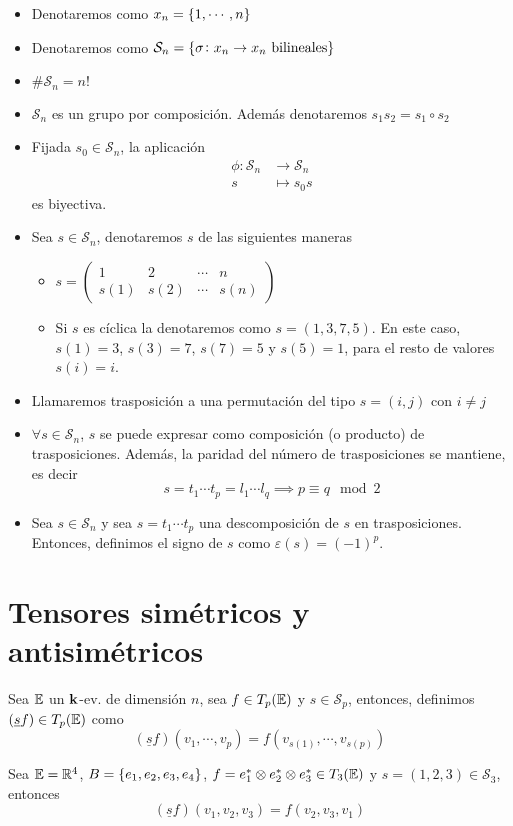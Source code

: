 \begin{itemize}
	\item Denotaremos como $x_n = \left\{1, \cdots, n\right\}$
	\item Denotaremos como $\mathcal{S}_n =\left\{\sigma\colon x_n \to
		x_n \text{ bilineales}\right\}$
	\item $\#\mathcal{S}_n= n!$
	\item $\mathcal{S}_n$ es un grupo por composición. Además denotaremos
		$s_1 s_2 = s_1 \circ s_2$
	\item\label{obs:perm_biy} Fijada $s_0 \in \mathcal{S}_n$, la aplicación
		\[
			\begin{aligned}
				\phi \colon \mathcal{S}_n &\to \mathcal{S}_n \\
				s &\mapsto s_0s
			\end{aligned}
		\]
		es biyectiva.
	\item Sea $s \in \mathcal{S}_n$, denotaremos $s$  de las siguientes maneras
		\begin{itemize}
			\item $s = \begin{pmatrix}
				1 & 2 & \cdots & n \\
				s(1) & s(2) & \cdots & s(n)
			\end{pmatrix}$
			\item Si $s$ es cíclica la denotaremos como $s = (1,3,7,5)$. En este
			caso, $s(1)=3$, $s(3)=7$, $s(7)=5$ y $s(5)=1$, para el resto de valores
			$s(i)=i$.
		\end{itemize}
	\item Llamaremos trasposición a una permutación del tipo $s=(i,j)$ con
		$i \neq j$
	\item $\forall s \in \mathcal{S}_n$, $s$ se puede expresar como composición
		(o producto) de trasposiciones. Además, la paridad del número de
		trasposiciones se mantiene, es decir
		\[
			s = t_1 \cdots t_p = l_1 \cdots l_q \implies p \equiv q \mod 2
		\]
	\item Sea $s \in \mathcal{S}_n$ y sea $s=t_1 \cdots t_p$ una descomposición de
		$s$ en trasposiciones. Entonces, definimos el signo de $s$ como
		$\varepsilon(s) = (-1)^p$.
\end{itemize}

\section{Tensores simétricos y antisimétricos}

\begin{defi}
	Sea $\mathbb{E}$ un $\mathbf{k}$-ev. de dimensión $n$, sea $f \in T_p(\mathbb{E})$ y $s \in\mathcal{S}_p$,
	entonces, definimos $(\underline{s}f) \in T_p(\mathbb{E})$ como
	\[
		(\underline{s}f)(v_1, \cdots, v_p) = f(v_{s(1)}, \cdots, v_{s(p)})
	\]
\end{defi}
\begin{example}
	Sea $\mathbb{E} = \mathbb{R}^4$, $B = \left\{e_1, e_2, e_3, e_4\right\}$, $f = e_1^* \otimes e_2^*
	\otimes e_3^* \in T_3(\mathbb{E})$ y $s = (1,2,3) \in \mathcal{S}_3$, entonces
	\[
		(\underline{s}f)(v_1,v_2,v_3) = f(v_2,v_3,v_1)
	\]
\end{example}

